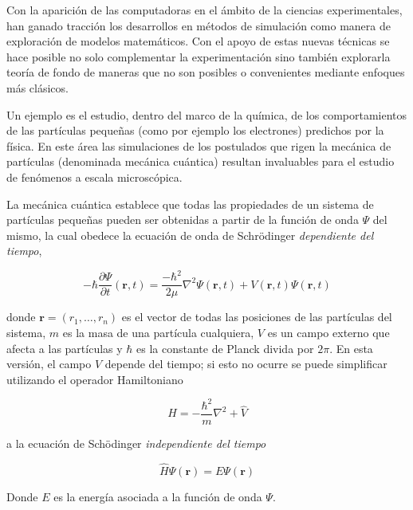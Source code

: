 Con la aparici\'on de las computadoras en el \'ambito de la ciencias experimentales, han
ganado tracci\'on los desarrollos en m\'etodos de simulaci\'on como manera de exploraci\'on
de modelos matem\'aticos. Con el apoyo de estas nuevas t\'ecnicas se hace posible no solo
complementar la experimentaci\'on sino tambi\'en explorarla teor\'ia de fondo de maneras que
no son posibles o convenientes mediante enfoques m\'as cl\'asicos. 

Un ejemplo es el estudio, dentro del marco de la qu\'imica, de los comportamientos de las 
part\'iculas peque\~nas (como por ejemplo los electrones) predichos por la f\'isica. En este \'area las
simulaciones de los postulados que rigen la mec\'anica de part\'iculas (denominada mec\'anica cu\'antica)
resultan invaluables para el estudio de fen\'omenos a escala microsc\'opica.

La mec\'anica cu\'antica establece que todas las propiedades de un sistema de part\'iculas peque\~nas
pueden ser obtenidas a partir de la funci\'on de onda $\Psi$ del mismo, la cual obedece la 
ecuaci\'on de onda de Schr\"odinger \textit{dependiente del tiempo},

\begin{equation}
    \label{schro_time_dep}
    -\hbar\frac{\partial \Psi}{\partial t} (\mathbf{r},t) = \frac{-\hbar^2}{2\mu}\nabla^2 \Psi(\mathbf{r},t) + V(\mathbf{r},t) \Psi(\mathbf{r},t)
\end{equation}

donde $\mathbf{r} = (r_1,\dots,r_n)$ es el vector de todas las posiciones de las part\'iculas del sistema,
$m$ es la masa de una part\'icula cualquiera, $V$ es un campo externo que afecta a las part\'iculas y
$\hbar$ es la constante de Planck divida por $2\pi$. En esta versi\'on, el campo $V$ depende del tiempo; si
esto no ocurre se puede simplificar utilizando el operador Hamiltoniano

\begin{equation*}
    \hat{H} =  -\frac{\hbar^2}{m} \nabla^2 + \hat{V}
\end{equation*}

a la ecuaci\'on de Sch\"odinger \textit{independiente del tiempo}

\begin{equation}
    \label{schro_time_indep}
    \hat{H} \Psi(\mathbf{r}) = E \Psi(\mathbf{r})
\end{equation}

Donde $E$ es la energ\'ia asociada a la funci\'on de onda $\Psi$.

